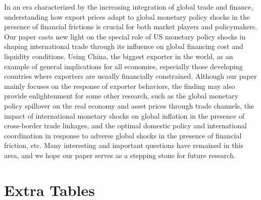 In an era characterized by the increasing integration of global trade and finance, understanding how export prices adapt to global monetary policy shocks in the presence of financial frictions is crucial for both market players and policymakers. Our paper casts new light on the special role of US monetary policy shocks in shaping international trade through its influence on global financing cost and liquidity conditions. Using China, the biggest exporter in the world, as an example of general implications for all economies, especially those developing countries where exporters are usually financially constrained. Although our paper mainly focuses on the response of exporter behaviors, the finding may also provide enlightenment for some other research, such as the global monetary policy spillover on the real economy and asset prices through trade channels, the impact of international monetary shocks on global inflation in the presence of cross-border trade linkages, and the optimal domestic policy and international coordination in response to adverse global shocks in the presence of financial friction, etc. Many interesting and important questions have remained in this area, and we hope our paper serves as a stepping stone for future research.


\newpage


\appendix

\section{Extra Tables}\label{Appendix-Tables}

\setcounter{table}{0}

\renewcommand{\thetable}{A\arabic{table}}

